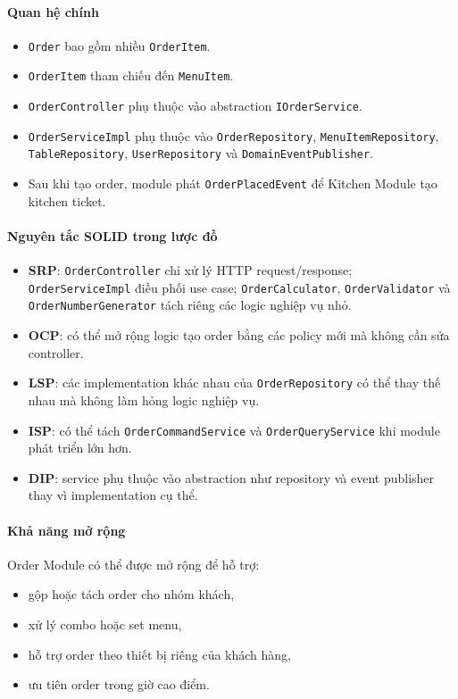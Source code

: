 \documentclass[12pt,a4paper]{article}
\begin{document}
\paragraph{Quan hệ chính}
\begin{itemize}
    \item \texttt{Order} bao gồm nhiều \texttt{OrderItem}.
    \item \texttt{OrderItem} tham chiếu đến \texttt{MenuItem}.
    \item \texttt{OrderController} phụ thuộc vào abstraction \texttt{IOrderService}.
    \item \texttt{OrderServiceImpl} phụ thuộc vào \texttt{OrderRepository}, \texttt{MenuItemRepository}, \texttt{TableRepository}, \texttt{UserRepository} và \texttt{DomainEventPublisher}.
    \item Sau khi tạo order, module phát \texttt{OrderPlacedEvent} để Kitchen Module tạo kitchen ticket.
\end{itemize}

\paragraph{Nguyên tắc SOLID trong lược đồ}
\begin{itemize}
    \item \textbf{SRP}: \texttt{OrderController} chỉ xử lý HTTP request/response; \texttt{OrderServiceImpl} điều phối use case; \texttt{OrderCalculator}, \texttt{OrderValidator} và \texttt{OrderNumberGenerator} tách riêng các logic nghiệp vụ nhỏ.
    \item \textbf{OCP}: có thể mở rộng logic tạo order bằng các policy mới mà không cần sửa controller.
    \item \textbf{LSP}: các implementation khác nhau của \texttt{OrderRepository} có thể thay thế nhau mà không làm hỏng logic nghiệp vụ.
    \item \textbf{ISP}: có thể tách \texttt{OrderCommandService} và \texttt{OrderQueryService} khi module phát triển lớn hơn.
    \item \textbf{DIP}: service phụ thuộc vào abstraction như repository và event publisher thay vì implementation cụ thể.
\end{itemize}

\paragraph{Khả năng mở rộng}
Order Module có thể được mở rộng để hỗ trợ:
\begin{itemize}
    \item gộp hoặc tách order cho nhóm khách,
    \item xử lý combo hoặc set menu,
    \item hỗ trợ order theo thiết bị riêng của khách hàng,
    \item ưu tiên order trong giờ cao điểm.
\end{itemize}
\end{document}
